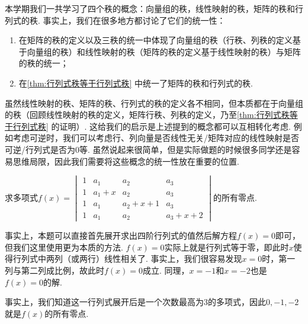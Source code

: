本学期我们一共学习了四个秩的概念：向量组的秩，线性映射的秩，矩阵的秩和行列式的秩. 事实上，我们在很多地方都讨论了它们的统一性：
\begin{enumerate}
    \item 在矩阵的秩的定义以及三秩的统一中体现了向量组的秩（行秩、列秩的定义基于向量组的秩）和线性映射的秩（矩阵的秩的定义基于线性映射的秩）与矩阵的秩的统一；

    \item 在\autoref{thm:行列式秩等于行列式秩} 中统一了矩阵的秩和行列式的秩.
\end{enumerate}
虽然线性映射的秩、矩阵的秩、行列式的秩的定义各不相同，但本质都在于向量组的秩（回顾线性映射的秩的定义，矩阵行秩、列秩的定义，乃至\autoref{thm:行列式秩等于行列式秩} 的证明）. 这给我们的启示是上述提到的概念都可以互相转化考虑. 例如考虑可逆时，我们可以考虑行、列向量是否线性无关/矩阵对应的线性映射是否可逆/行列式是否为0等. 虽然说起来很简单，但是实际做题的时候很多同学还是容易思维局限，因此我们需要将这些概念的统一性放在重要的位置.
\begin{example}{}{}
    求多项式$f(x)=\begin{vmatrix}
            1 & a_1   & a_2     & a_3     \\
            1 & a_1+x & a_2     & a_3     \\
            1 & a_1   & a_2+x+1 & a_3     \\
            1 & a_1   & a_2     & a_3+x+2
        \end{vmatrix}$的所有零点.
\end{example}

\begin{solution}
    事实上，本题可以直接首先展开求出四阶行列式的值然后解方程$f(x)=0$即可，但我们这里使用更为本质的方法. $f(x)=0$实际上就是行列式等于零，即此时$x$使得行列式中两列（或两行）线性相关了. 事实上，我们很容易发现$x=0$时，第一列与第二列成比例，故此时$f(x)=0$成立. 同理，$x=-1$和$x=-2$也是$f(x)=0$的解.

    事实上，我们知道这一行列式展开后是一个次数最高为3的多项式，因此$0,-1,-2$就是$f(x)$的所有零点.
\end{solution}


